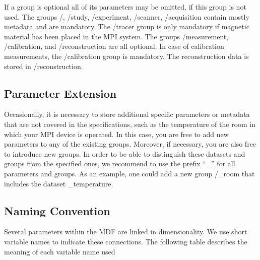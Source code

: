 \documentclass[landscape,a4paper]{article} %
\newcommand{\inlvar}[1]{{\ttfamily#1}}
\begin{document}
\begin{multicols}{2}
If a group is optional all of its parameters may be omitted, if this group is not used. The groups \inlvar{/}, \inlvar{/study}, \inlvar{/experiment}, \inlvar{/scanner}, \inlvar{/acquisition} contain mostly metadata and are mandatory. The \inlvar{/tracer} group is only mandatory if magnetic material has been placed in the MPI system. The groups \inlvar{/measurement}, \inlvar{/calibration}, and \inlvar{/reconstruction} are all optional. In case of calibration measurements, the \inlvar{/calibration} group is mandatory. The reconstruction data is stored in \inlvar{/reconstruction}. 

\subsection{Parameter Extension}

Occasionally, it is necessary to store additional specific parameters or metadata that are not covered in the specifications, such as the temperature of the room in which your MPI device is operated. In this case, you are free to add new parameters to any of the existing groups. Moreover, if necessary, you are also free to introduce new groups. In order to be able to distinguish these datasets and groups from the specified ones, we recommend to use the prefix ``\inlvar{\_}'' for all parameters and groups. As an example, one could add a new group \inlvar{/\_room} that includes the dataset \inlvar{\_temperature}.

\subsection{Naming Convention}

Several parameters within the MDF are linked in dimensionality. We use short variable names to indicate these connections. The following table describes the meaning of each variable name used



\end{multicols}
\end{document}
